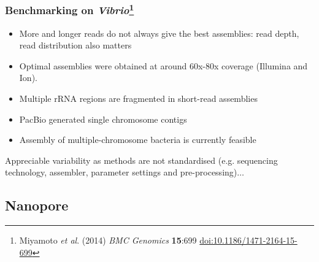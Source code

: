 \begin{frame}
  \frametitle{Benchmarking on \textit{Vibrio}\footnote{\tiny{Miyamoto \textit{et al}. (2014) \textit{BMC Genomics} \textbf{15}:699 \href{http://dx.doi.org/10.1186/1471-2164-15-699}{doi:10.1186/1471-2164-15-699}}}}
  \begin{itemize}
    \item More and longer reads do not always give the best assemblies: read depth, read distribution also matters
    \item Optimal assemblies were obtained at around 60x-80x coverage (Illumina and Ion).
    \item Multiple rRNA regions are fragmented in short-read assemblies
    \item PacBio generated single chromosome contigs
    \item Assembly of multiple-chromosome bacteria is currently feasible
  \end{itemize}  
  Appreciable variability as methods are not standardised (e.g. sequencing technology, assembler, parameter settings and pre-processing)$\ldots$
\end{frame}

\subsection{Nanopore}


